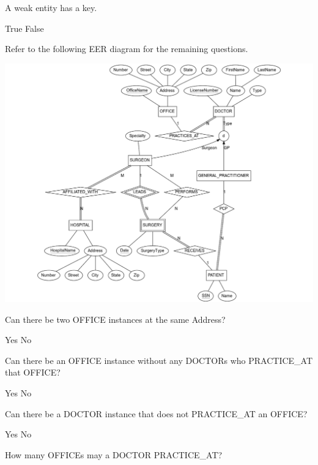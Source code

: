 \documentclass[9pt]{exam}
\begin{document}
\begin{questions}
\question[4] A weak entity has a key.

\begin{choices}
\choice True
\correctchoice False
\end{choices}

\newpage

Refer to the following EER diagram for the remaining questions.

\begin{center}
  \hspace{-.5in}\includegraphics[width=7in]{doctors.pdf}
\end{center}

\newpage

\question[4] Can there be two OFFICE instances at the same Address?

\begin{choices}
\correctchoice Yes
\choice No
\end{choices}

\question[4] Can there be an OFFICE instance without any DOCTORs who PRACTICE\_AT that OFFICE?

\begin{choices}
\correctchoice Yes
\choice No
\end{choices}

\question[4] Can there be a DOCTOR instance that does not PRACTICE\_AT an OFFICE?

\begin{choices}
\choice Yes
\correctchoice No
\end{choices}

\question[4] How many OFFICEs may a DOCTOR PRACTICE\_AT?


\end{questions}
\end{document}
